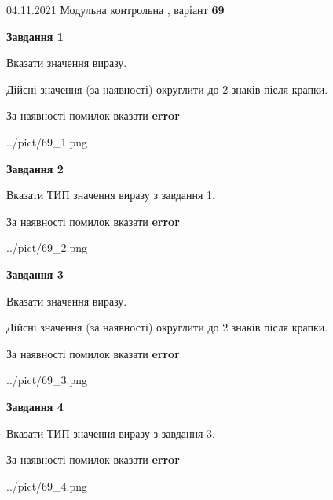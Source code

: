 \documentclass[11pt, ukrainian]{article}
\begin{document}
{04.11.2021 Модульна контрольна , варіант  \No \textbf { 69 }\par}
{
\begin {large}
{\begin {center}\textbf{Завдання 1}\end {center}}\par
Вказати значення виразу. \par
Дійсні значення (за наявності) округлити до 2 знаків після крапки. \par
За наявності помилок вказати \textbf{error}

\begin{center}
	{../pict/69_1.png}
\end{center}
\newpage

{\begin {center}\textbf{Завдання 2}\end {center}}\par
Вказати ТИП значення виразу з завдання 1. \par
За наявності помилок вказати \textbf{error}

\begin{center}
	{../pict/69_2.png}
\end{center}
\newpage

{\begin {center}\textbf{Завдання 3}\end {center}}\par
Вказати значення виразу. \par
Дійсні значення (за наявності) округлити до 2 знаків після крапки. \par
За наявності помилок вказати \textbf{error}

\begin{center}
	{../pict/69_3.png}
\end{center}
\newpage

{\begin {center}\textbf{Завдання 4}\end {center}}\par
Вказати ТИП значення виразу з завдання 3. \par
За наявності помилок вказати \textbf{error}

\begin{center}
	{../pict/69_4.png}
\end{center}
\newpage


\end{large}}
\end{document}
